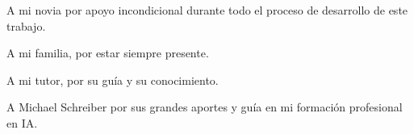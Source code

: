 \documentclass[
    11pt,
    spanish,
    singlespacing,
    parskip,
    headsepline,
    bookmarks=true,
    unicode=true,
    pdftoolbar=true,
    pdfmenubar=true,
    pdffitwindow=false,
    colorlinks=true,
    linkcolor=blue,
    citecolor=blue,
    urlcolor=blue
]{MastersDoctoralThesis}
\def\textbf#1{#1}%
\def\textit#1{#1}%
\begin{document}



\frontmatter %
\pagestyle{plain} %


\begin{abstract}
\addchaptertocentry{\abstractname} %
El presente trabajo desarrolla una solución avanzada para la automatización de la comunicación empresarial, orientada a emprendedores y pequeñas empresas. El sistema desarrollado consiste en un chatbot que integra técnicas de procesamiento del lenguaje natural (PLN) y gestión de bases de datos, articulado en un \textit{pipeline} de aprendizaje continuo. Este chatbot está diseñado para optimizar la interacción con los clientes, ya que genera respuestas precisas y relevantes a sus consultas en lenguaje natural. Además, el sistema se retroalimenta de las interacciones previas para mejorar su rendimiento de manera constante y adaptarse mejor a las necesidades de los usuarios.
\end{abstract}


\begin{acknowledgements}
\vspace{1.5cm}

A mi novia por apoyo incondicional durante todo el proceso de desarrollo de este trabajo. 

A mi familia, por estar siempre presente. 

A mi tutor, por su guía y su conocimiento.

A Michael Schreiber por sus grandes aportes y guía en mi formación profesional en IA. 

\end{acknowledgements}
\end{document}
